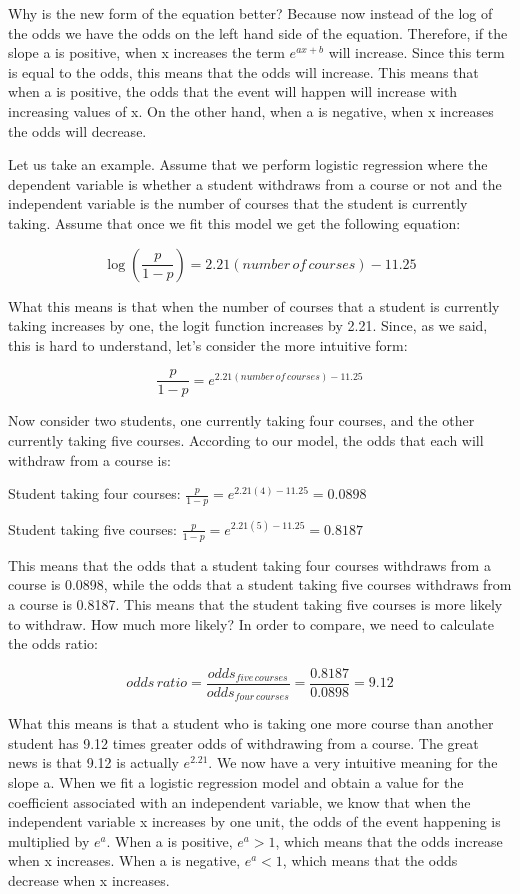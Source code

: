 \documentclass[a4paper,12pt,oneside]{book}
\begin{document}
Why is the new form of the equation better? Because now instead of the log of the odds we have the odds on the left hand side of the equation. Therefore, if the slope a is positive, when x increases the 
term $e^{ax+b}$ will increase. Since this term is equal to the odds, this means that the odds will increase. This means that when a is positive, the odds that the event will happen will increase with increasing 
values of x. On the other hand, when a is negative, when x increases the odds will decrease. 

Let us take an example. Assume that we perform logistic regression where the dependent variable is whether a student withdraws from a course or not and the independent variable is the number of courses that 
the student is currently taking. Assume that once we fit this model we get the following equation:

$$ \log(\frac{p}{1-p})=2.21(number\, of\, courses)-11.25 $$

What this means is that when the number of courses that a student is currently taking increases by one, the logit function increases by 2.21. Since, as we said, this is hard to understand, let’s consider the 
more intuitive form:

$$ \frac{p}{1-p}=e^{2.21(number\, of\, courses)-11.25} $$

Now consider two students, one currently taking four courses, and the other currently taking five courses. According to our model, the odds that each will withdraw from a course is:

Student taking four courses: $ \frac{p}{1-p}=e^{2.21(4)-11.25}=0.0898 $

Student taking five courses: $ \frac{p}{1-p}=e^{2.21(5)-11.25}=0.8187 $

This means that the odds that a student taking four courses withdraws from a course is 0.0898, while the odds that a student taking five courses withdraws from a course is 0.8187. 
This means that the student taking five courses is more likely to withdraw. How much more likely? In order to compare, we need to calculate the odds ratio:

$$ odds\, ratio = \frac{odds_{five\, courses}}{odds_{four\, courses}}=\frac{0.8187}{0.0898}=9.12 $$

What this means is that a student who is taking one more course than another student has 9.12 times greater odds of withdrawing from a course. The great news is that 9.12 is actually $e^{2.21}$. 
We now have a very intuitive meaning for the slope a. When we fit a logistic regression model and obtain a value for the coefficient associated with an independent variable, we know that when the 
independent variable x increases by one unit, the odds of the event happening is multiplied by $e^a$. When a is positive, $e^a>1$, which means that the odds increase when x increases. When a is negative, 
$e^a<1$, which means that the odds decrease when x increases.
\end{document}
